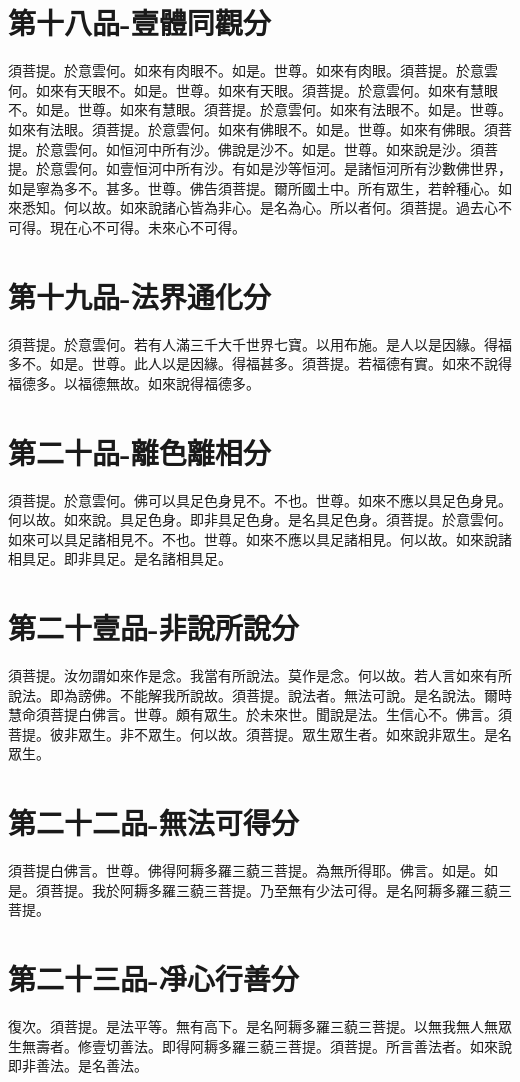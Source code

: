 \documentclass[a6paper, 22pt, twocolumn]{cvertbook}
\begin{document}
\chapter{第十八品-壹體同觀分}
\large 須菩提。於意雲何。如來有肉眼不。如是。世尊。如來有肉眼。須菩提。於意雲何。如來有天眼不。如是。世尊。如來有天眼。須菩提。於意雲何。如來有慧眼不。如是。世尊。如來有慧眼。須菩提。於意雲何。如來有法眼不。如是。世尊。如來有法眼。須菩提。於意雲何。如來有佛眼不。如是。世尊。如來有佛眼。須菩提。於意雲何。如恒河中所有沙。佛說是沙不。如是。世尊。如來說是沙。須菩提。於意雲何。如壹恒河中所有沙。有如是沙等恒河。是諸恒河所有沙數佛世界，如是寧為多不。甚多。世尊。佛告須菩提。爾所國土中。所有眾生，若幹種心。如來悉知。何以故。如來說諸心皆為非心。是名為心。所以者何。須菩提。過去心不可得。現在心不可得。未來心不可得。
\chapter{第十九品-法界通化分}
\large 須菩提。於意雲何。若有人滿三千大千世界七寶。以用布施。是人以是因緣。得福多不。如是。世尊。此人以是因緣。得福甚多。須菩提。若福德有實。如來不說得福德多。以福德無故。如來說得福德多。
\chapter{第二十品-離色離相分}
\large 須菩提。於意雲何。佛可以具足色身見不。不也。世尊。如來不應以具足色身見。何以故。如來說。具足色身。即非具足色身。是名具足色身。須菩提。於意雲何。如來可以具足諸相見不。不也。世尊。如來不應以具足諸相見。何以故。如來說諸相具足。即非具足。是名諸相具足。
\chapter{第二十壹品-非說所說分}
\large 須菩提。汝勿謂如來作是念。我當有所說法。莫作是念。何以故。若人言如來有所說法。即為謗佛。不能解我所說故。須菩提。說法者。無法可說。是名說法。爾時慧命須菩提白佛言。世尊。頗有眾生。於未來世。聞說是法。生信心不。佛言。須菩提。彼非眾生。非不眾生。何以故。須菩提。眾生眾生者。如來說非眾生。是名眾生。
\chapter{第二十二品-無法可得分}
\large 須菩提白佛言。世尊。佛得阿耨多羅三藐三菩提。為無所得耶。佛言。如是。如是。須菩提。我於阿耨多羅三藐三菩提。乃至無有少法可得。是名阿耨多羅三藐三菩提。

\chapter{第二十三品-凈心行善分}
\large 復次。須菩提。是法平等。無有高下。是名阿耨多羅三藐三菩提。以無我無人無眾生無壽者。修壹切善法。即得阿耨多羅三藐三菩提。須菩提。所言善法者。如來說即非善法。是名善法。
\end{document}
